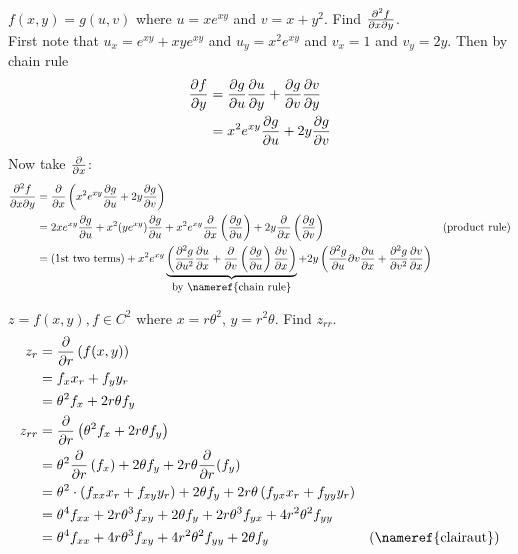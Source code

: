 \documentclass[english, 11pt]{article}
\begin{document}
\begin{exmp}
  $f(x,y) = g(u,v)$ where $u = xe^{xy}$ and $v= x+y^2$. Find $\frac{\partial^2 f}{\partial x \partial y}$. \\

  First note that $u_x = e^{xy} + xye^{xy}$ and $u_y = x^2e^{xy}$ and $v_x = 1$ and $v_y = 2y$. Then by chain rule
  \begin{align*}
    \frac{\partial f}{\partial y} & = \frac{\partial g}{\partial u}\frac{\partial u}{\partial y} + \frac{\partial g}{\partial v}\frac{\partial v}{\partial y} \\
    & = x^2e^{xy}\frac{\partial g}{\partial u} + 2y\frac{\partial g}{\partial v}
  \end{align*}
  Now take $\frac{\partial}{\partial x}$:
  \begin{align*}
    \f{\di^2 f}{\di x \di y} & = \f{\di}{\di x} \left( x^2 e^{xy} \f{\di g}{\di u} + 2y\f{\di g}{\di v} \right) \\
    & = 2xe^{xy} \f{\di g}{\di u} + x^2 (ye^{xy}) \f{\di g}{\di u} + x^2e^{xy} \f{\di}{\di x} \left( \f{\di g}{\di u} \right) + 2y\f{\di}{\di x} \left( \f{\di g}{\di v} \right) & \mbox{(product rule)} \\
    & = \mbox{(1st two terms)} + x^2e^{xy}\ub{\left( \f{\di^2 g}{\di u^2} \f{\di u}{\di x} + \f{\di}{\di v} \left( \f{\di g}{\di u} \right) \f{\di v}{\di x} \right)}_{\mbox{by \nameref{chain rule}}} + 2y \left( \f{\di^2 g}{\di u}{\di v} \f{\di u}{\di x} + \f{\di^2 g}{\di v^2} \f{\di v}{\di x} \right)
  \end{align*}

  \begin{exmp}
    $z = f(x,y), f \in C^2$ where $x = r\theta^2$, $y = r^2\theta$. Find $z_{rr}$. \\
    \begin{align*}
      z_r & = \f{\di}{\di r} \left( f(x,y) \right) \\
      & = f_xx_r + f_yy_r \\
      & = \theta^2f_x + 2r\theta f_y \\
      z_{rr} & = \f{\di}{\di r} \left( \theta^2f_x + 2r\theta f_y \right) \\
      &  = \theta^2 \f{\di}{\di r}\left( f_x \right) + 2\theta f_y + 2r\theta \f{\di}{\di r} (f_y) \\
      & = \theta^2 \cdot \left( f_{xx}x_r + f_{xy}y_r \right) + 2\theta f_y + 2r\theta \left( f_{yx}x_r + f_{yy}y_r \right) \\
      & = \theta^4 f_{xx} + 2r\theta^3 f_{xy} + 2\theta f_y + 2r\theta^3 f_{yx} + 4r^2\theta^2 f_{yy} \\
      & = \theta^4 f_{xx} + 4r\theta^3 f_{xy} + 4r^2\theta^2 f_{yy} + 2\theta f_y & \mbox{(\nameref{clairaut})}
    \end{align*}
  \end{exmp}
\end{exmp}
\end{document}
